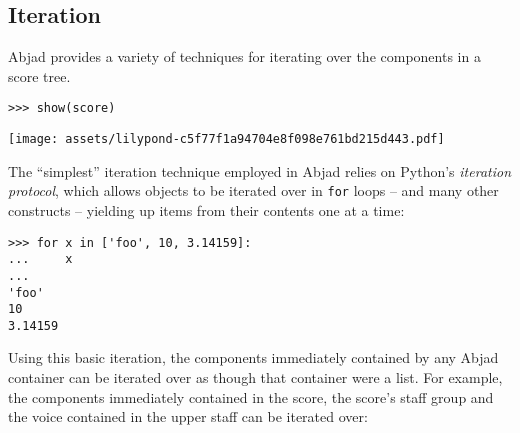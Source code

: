 \noindent

\subsection{Iteration}
\label{ssec:iteration}

Abjad provides a variety of techniques for iterating over the components in a
score tree.

\begin{comment}
<abjad>
show(score)
</abjad>
\end{comment}

\begin{abjadbookoutput}
\begin{singlespacing}
\vspace{-0.5\baselineskip}
\begin{verbatim}
>>> show(score)
\end{verbatim}
\noindent\texttt{[image: assets/lilypond-c5f77f1a94704e8f098e761bd215d443.pdf]}
\end{singlespacing}
\end{abjadbookoutput}

\noindent The \enquote{simplest} iteration technique employed in Abjad relies
on Python's \emph{iteration protocol}, which allows objects to be iterated over
in \texttt{for} loops -- and many other constructs -- yielding up items from
their contents one at a time:

\begin{comment}
<abjad>
for x in ['foo', 10, 3.14159]:
    x

</abjad>
\end{comment}

\begin{abjadbookoutput}
\begin{singlespacing}
\vspace{-0.5\baselineskip}
\begin{verbatim}
>>> for x in ['foo', 10, 3.14159]:
...     x
...
'foo'
10
3.14159
\end{verbatim}
\end{singlespacing}
\end{abjadbookoutput}

\noindent Using this basic iteration, the components immediately contained by
any Abjad container can be iterated over as though that container were a list.
For example, the components immediately contained in the score, the score's
staff group and the voice contained in the upper staff can be iterated over:

